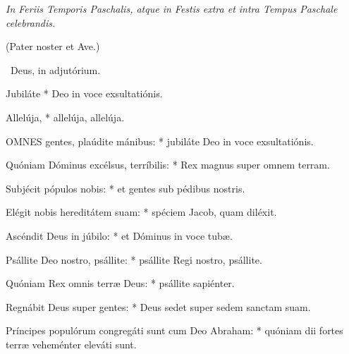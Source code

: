 

\textit{In Feriis Temporis Paschalis, atque in Festis extra et intra Tempus Paschale celebrandis.}

(Pater noster et Ave.)

\V\ Deus, in adjutórium.


 Jubiláte * Deo in voce exsultatiónis.


 Allelúja, * allelúja, allelúja.




\lettrine[lines=2]{O}{MNES} gentes, plaúdite mánibus: * jubiláte Deo in voce exsultatiónis.

Quóniam Dóminus excélsus, terríbilis: * Rex magnus super omnem terram.

Subjécit pópulos nobis: * et gentes sub pédibus nostris.

Elégit nobis hereditátem suam: * spéciem Jacob, quam diléxit.

Ascéndit Deus in júbilo: * et Dóminus in voce tubæ.

Psállite Deo nostro, psállite: * psállite Regi nostro, psállite.

Quóniam Rex omnis terræ Deus: * psállite sapiénter.

Regnábit Deus super gentes: * Deus sedet super sedem sanctam suam.

Príncipes populórum congregáti sunt cum Deo Abraham: * quóniam dii fortes terræ veheménter eleváti sunt.

